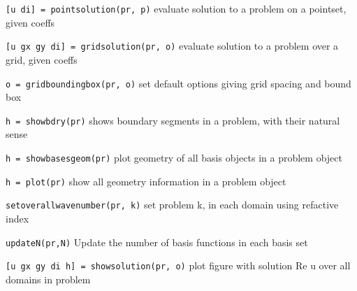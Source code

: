 {\tt [u di] = pointsolution(pr, p)} evaluate solution to a problem on
a pointset, given coeffs

{\tt [u gx gy di] = gridsolution(pr, o)} evaluate solution to a
problem over a grid, given coeffs

{\tt o = gridboundingbox(pr, o)} set default options giving grid spacing
and bound box

{\tt h = showbdry(pr)} shows boundary segments in a problem, with
their natural sense

{\tt h = showbasesgeom(pr)} plot geometry of all basis objects in a problem object

{\tt h = plot(pr)} show all geometry information in a problem object

{\tt setoverallwavenumber(pr, k)} set problem k, in each domain using
refactive index

{\tt updateN(pr,N)} Update the number of basis functions in each basis set

{\tt [u gx gy di h] = showsolution(pr, o)} plot figure with solution Re u
over all domains in problem

\newpage




 
 
 
















